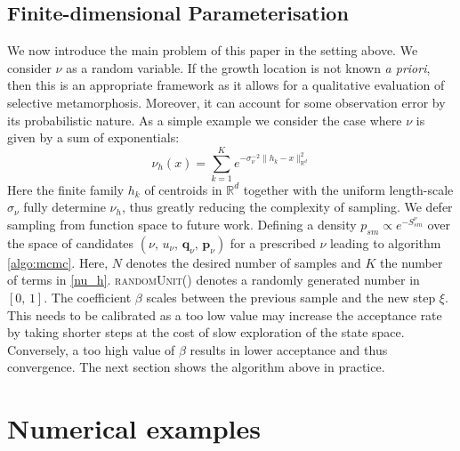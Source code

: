 \documentclass[runningheads]{llncs}
\newcommand{\Rd}{\mathbb{R}^{d}}
\begin{document}
\subsection{Finite-dimensional Parameterisation}\label{subs:finite-dim-param}

We now introduce the main problem of this paper in the setting above. We
consider $\nu$ as a random variable. If the growth location is not known \emph{a
priori}, then this is an appropriate framework as it allows for a qualitative
evaluation of selective metamorphosis. Moreover, it can account for some
observation error by its probabilistic nature. As a simple example we consider
the case where $\nu$ is given by a sum of exponentials:
\begin{equation}\label{nu_h}
    \nu_h (x) = \sum_{k=1}^K e^{ -\sigma_\nu^{-2}\|h_k - x\|_{\Rd}^2}
\end{equation}
Here the finite family $h_k$ of centroids in $\Rd$ together with the uniform
length-scale $\sigma_\nu$ fully determine $\nu_h$, thus greatly reducing the
complexity of sampling. We defer sampling from function space to future work.
Defining a density $p_{sm} \propto e^{- S_{sm}^\nu}$ over the space of
candidates $(\nu,\,u_\nu,\,\mathbf q_\nu,\,\mathbf p_\nu)$ for a prescribed
$\nu$ leading to algorithm \ref{algo:mcmc}. Here, $N$ denotes the desired number
of samples and $K$ the number of terms in \eqref{nu_h}. \textsc{randomUnit()}
denotes a randomly generated number in $[0,\,1]$. The coefficient $\beta$ scales
between the previous sample and the new step $\xi$. This needs to be calibrated
as a too low value may increase the acceptance rate by taking shorter steps at
the cost of slow exploration of the state space. Conversely, a too high value of
$\beta$ results in lower acceptance and thus convergence. The next section shows
the algorithm above in practice.

\section{Numerical examples}\label{sec:numerical}
\end{document}
